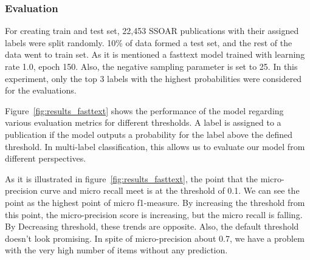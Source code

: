\subsubsection{Evaluation}

For creating train and test set, 22,453 SSOAR publications with their assigned labels were split randomly. 10\% of data formed a test set, and the rest of the data went to train set. As it is mentioned a fasttext model trained with learning rate 1.0, epoch 150. Also, the negative sampling parameter is set to 25.  In this experiment, only the top 3 labels with the highest probabilities were considered for the evaluations.

Figure~\ref{fig:results_fasttext} shows the performance of the model regarding various evaluation metrics for different thresholds. A label is assigned to a publication if the model outputs a probability for the label above the defined threshold. In multi-label classification, this allows us to evaluate our model from different perspectives. 

As it is illustrated in figure~\ref{fig:results_fasttext}, the point that the micro-precision curve and micro recall meet is at the threshold of 0.1. We can see the point as the highest point of micro f1-measure. By increasing the threshold from this point, the micro-precision score is increasing, but the micro recall is falling. By Decreasing threshold, these trends are opposite.  Also, the default threshold doesn't look promising. In spite of micro-precision about 0.7, we have a problem with the very high number of items without any prediction. 


\begin{comment}

This graph shows the change of different evaluation metrics over different probability thresholds for generating the result. 
The threshold defines the minimum probability of a label which is leading to an assignment.

Orderly, micro precision and micro recall values are 0.5 for threshold 0.1
For this threshold, the model generates a prediction for all items and about half of the items have at least one correct prediction. 
All these metrics remain the same till threshold 0.2. Till threshold 0.6, we can see a dramatic increase in the micro precision and the number of items without any correct prediction. Both of these metrics pass 0.8. On the other hand, micro recall falls to the below of 0.2. In this case, selecting threshold seems hard task, since the conflict point of precision and recall is a threshold about 0.25 but both of these metrics at the point are not more than 0.3 and also we have more than 0.4 items with completely wrong predictions. Also, the default threshold doesn't look promising. In spite of micro precision about 0.7, we have a problem with the very high number of items without any prediction.
\end{comment}

